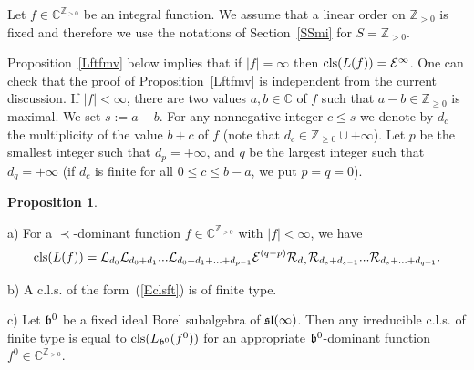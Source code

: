 \documentclass[10pt]{amsart}\oddsidemargin -1mm \evensidemargin -1mm \topmargin -15mm\headheight5mm \headsep 3.5mm \textheight 245mm\textwidth 170mm %
\theoremstyle{definition}\newtheorem{theorem}{Theorem}[section]\newtheorem{lemma}[theorem]{Lemma}\newtheorem{remark}[theorem]{Remark}\newtheorem{proposition}[theorem]{Proposition}\newtheorem{corollary}[theorem]{Corollary}\newtheorem{definition}[theorem]{Definition}\newtheorem{Ex}[theorem]{Example}
\begin{document}
Let $f\in\mathbb C^{\mathbb Z_{>0}}$ be an integral function. We assume that a linear order on $\mathbb Z_{>0}$ is fixed and therefore we use the notations of Section~\ref{SSmi} for $S=\mathbb Z_{>0}$.

Proposition~\ref{Lftfmv} below implies that if $|f|=\infty$ then $\operatorname{\mathrm{cls}}(L(f))=\mathcal E^\infty$. One can
check that the proof of Proposition~\ref{Lftfmv} is independent from
the current discussion. If $|f|<\infty$, there are two values $a, b\in\mathbb C$ of $f$ such that $a-b\in\mathbb Z_{\ge0}$ is maximal. We set $s:=a-b$. For any nonnegative integer $c\le s$ we denote by $d_{c}$ the multiplicity of the value $b+c$ of $f$ (note that $d_{c}\in\mathbb Z_{\ge0}\cup+\infty$). Let $p$ be the smallest integer such that
$d_{p}=+\infty$, and $q$ be the largest integer such that
$d_{q}=+\infty$ (if $d_{c}$ is finite for all $0\le c\le b-a$, we put $p=q=0$).
\begin{proposition}\label{Lexpl}\label{CexY}

a) For a $\prec$-dominant function $f\in\mathbb C^{\mathbb Z_{>0}}$ with $|f|<\infty$, we have \begin{equation}\operatorname{\mathrm{cls}}(L(f))=\mathcal L_{d_0}\mathcal L_{d_0+d_1}...\mathcal L_{d_0+d_1+...+d_{p-1}}\mathcal E^{(q-p)}\mathcal R_{d_s}\mathcal R_{d_s+d_{s-1}}...\mathcal R_{d_s+...+d_{q+1}}.\label{Eclsft}\end{equation}

b) A c.l.s. of the form~(\ref{Eclsft}) is of finite type.

c) Let $\frak b^0$ be a fixed ideal Borel subalgebra of $\frak{sl}(\infty)$. Then any irreducible c.l.s. of finite type is equal to $\operatorname{\mathrm{cls}}(L_{\frak b^0}(f^0))$ for an appropriate $\frak b^0$-dominant function $f^0\in\mathbb C^{\mathbb Z_{>0}}$.\end{proposition}
\end{document}

